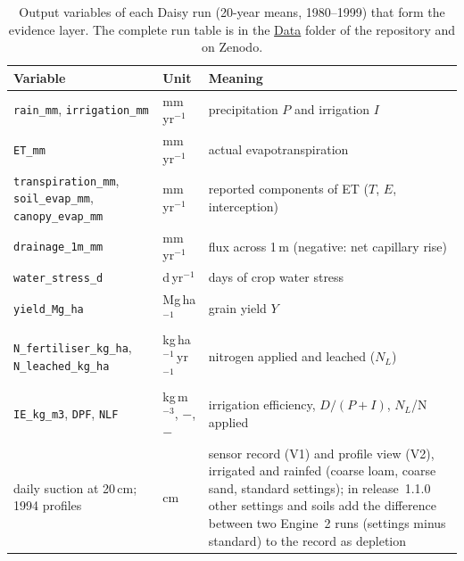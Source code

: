 \documentclass[preprint,12pt]{elsarticle}
\newcommand{\repourl}{https://github.com/halilunaziru73-creator/Coupled-Water-Fluxes-Pore-Scale-Dynamics-Precision-Irrigation-Mulching-Feedback-Loops}
\newcommand{\dataurl}{\repourl/tree/main/Data}
\newcommand{\datalink}{\href{\dataurl}{Data}}
\begin{document}
\begin{table}[H]\centering\small
\caption{Output variables of each Daisy run (20-year means, 1980--1999) that form the evidence layer. The complete run table is in the \datalink{} folder of the repository and on Zenodo.}
\label{tab:daisyvars}
\begin{tabularx}{\textwidth}{>{\raggedright\arraybackslash}p{4.3cm}lX}
\toprule
Variable & Unit & Meaning\\\midrule
\texttt{rain\_mm}, \texttt{irrigation\_mm} & mm\,yr$^{-1}$ & precipitation $P$ and irrigation $I$\\
\texttt{ET\_mm} & mm\,yr$^{-1}$ & actual evapotranspiration\\
\texttt{transpiration\_mm}, \texttt{soil\_evap\_mm}, \texttt{canopy\_evap\_mm} & mm\,yr$^{-1}$ & reported components of ET ($T$, $E$, interception)\\
\texttt{drainage\_1m\_mm} & mm\,yr$^{-1}$ & flux across 1\,m (negative: net capillary rise)\\
\texttt{water\_stress\_d} & d\,yr$^{-1}$ & days of crop water stress\\
\texttt{yield\_Mg\_ha} & Mg\,ha$^{-1}$ & grain yield $Y$\\
\texttt{N\_fertiliser\_kg\_ha}, \texttt{N\_leached\_kg\_ha} & kg\,ha$^{-1}$\,yr$^{-1}$ & nitrogen applied and leached ($N_L$)\\
\texttt{IE\_kg\_m3}, \texttt{DPF}, \texttt{NLF} & kg\,m$^{-3}$, $-$, $-$ & irrigation efficiency, $D/(P+I)$, $N_L$/N applied\\
daily suction at 20\,cm; 1994 profiles & cm & sensor record (V1) and profile view (V2), irrigated and rainfed (coarse loam, coarse sand, standard settings); in release~1.1.0 other settings and soils add the difference between two Engine~2 runs (settings minus standard) to the record as depletion\\\bottomrule
\end{tabularx}
\end{table}
\end{document}
